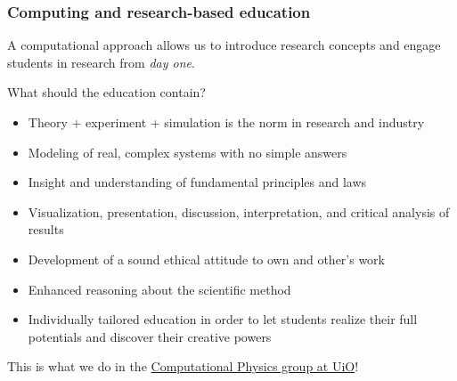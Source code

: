 \documentclass{beamer}
\begin{document}
\begin{frame}
\frametitle{Computing and research-based education}

\begin{block}{}
A computational approach allows us to introduce research concepts and engage students in research from \emph{day one}.
\end{block}


\begin{block}{What should the education contain? }

\begin{itemize}
\item Theory + experiment + simulation is the norm in research and industry

\item Modeling of real, complex systems with no simple answers

\item Insight and understanding of fundamental principles and laws

\item Visualization, presentation, discussion, interpretation, and critical analysis of results

\item Development of a sound ethical attitude to own and other's work

\item Enhanced reasoning about the scientific method

\item Individually tailored education in order to let students  realize their full potentials and discover their creative powers
\end{itemize}

\noindent
This is what we do in the \href{{http://www.mn.uio.no/fysikk/english/research/groups/computational/index.html}}{Computational Physics group at UiO}!
\end{block}
\end{frame}
\end{document}
